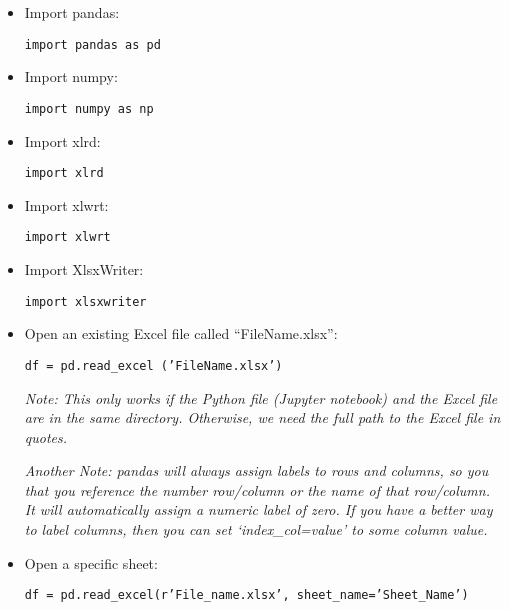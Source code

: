 \documentclass[11pt]{article}
\theoremstyle{definition}
\begin{document}
\begin{itemize}
\item  Import pandas:  \begin{center} \texttt{import pandas as pd} \end{center}
\item  Import numpy:  \begin{center} \texttt{import numpy as np} \end{center}

\item Import xlrd: \begin{center} \texttt{import xlrd}  \end{center}
\item Import xlwrt: \begin{center} \texttt{import xlwrt}  \end{center}

\item Import XlsxWriter: \begin{center} \texttt{import xlsxwriter}  \end{center}

\item  Open an existing Excel file called ``FileName.xlsx'': \begin{center} \texttt{df = pd.read\_excel ('FileName.xlsx')} \end{center}
\emph{Note: This only works if the Python file (Jupyter notebook) and the Excel file are in the same directory.  Otherwise, we need the full path to the Excel file in quotes.}

\emph{Another Note: pandas will always assign labels to rows and columns, so you that you reference the number row/column or the name of that row/column. It will automatically assign a numeric label of zero. If you have a better way to label columns, then you can set `index\_col=value' to some column value.}



\item Open a specific sheet: \begin{center} \texttt{df = pd.read\_excel(r'File\_name.xlsx', sheet\_name='Sheet\_Name')}\end{center}


\end{itemize}
\end{document}
